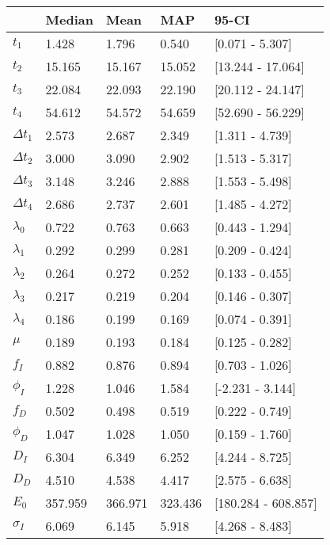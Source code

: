 \begin{tabular}{lllll}
\toprule
{} &   Median &     Mean &      MAP &                95-CI \\
\midrule
$t_1$        &    1.428 &    1.796 &    0.540 &      [0.071 - 5.307] \\
$t_2$        &   15.165 &   15.167 &   15.052 &    [13.244 - 17.064] \\
$t_3$        &   22.084 &   22.093 &   22.190 &    [20.112 - 24.147] \\
$t_4$        &   54.612 &   54.572 &   54.659 &    [52.690 - 56.229] \\
$\Delta t_1$ &    2.573 &    2.687 &    2.349 &      [1.311 - 4.739] \\
$\Delta t_2$ &    3.000 &    3.090 &    2.902 &      [1.513 - 5.317] \\
$\Delta t_3$ &    3.148 &    3.246 &    2.888 &      [1.553 - 5.498] \\
$\Delta t_4$ &    2.686 &    2.737 &    2.601 &      [1.485 - 4.272] \\
$\lambda_0$  &    0.722 &    0.763 &    0.663 &      [0.443 - 1.294] \\
$\lambda_1$  &    0.292 &    0.299 &    0.281 &      [0.209 - 0.424] \\
$\lambda_2$  &    0.264 &    0.272 &    0.252 &      [0.133 - 0.455] \\
$\lambda_3$  &    0.217 &    0.219 &    0.204 &      [0.146 - 0.307] \\
$\lambda_4$  &    0.186 &    0.199 &    0.169 &      [0.074 - 0.391] \\
$\mu$        &    0.189 &    0.193 &    0.184 &      [0.125 - 0.282] \\
$f_I$        &    0.882 &    0.876 &    0.894 &      [0.703 - 1.026] \\
$\phi_I$     &    1.228 &    1.046 &    1.584 &     [-2.231 - 3.144] \\
$f_D$        &    0.502 &    0.498 &    0.519 &      [0.222 - 0.749] \\
$\phi_D$     &    1.047 &    1.028 &    1.050 &      [0.159 - 1.760] \\
$D_I$        &    6.304 &    6.349 &    6.252 &      [4.244 - 8.725] \\
$D_D$        &    4.510 &    4.538 &    4.417 &      [2.575 - 6.638] \\
$E_0$        &  357.959 &  366.971 &  323.436 &  [180.284 - 608.857] \\
$\sigma_I$   &    6.069 &    6.145 &    5.918 &      [4.268 - 8.483] \\

\end{tabular}
